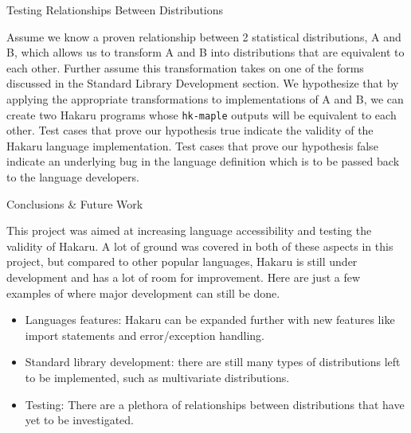 \documentclass[22pt]{beamer}
\begin{document}
\begin{frame}[fragile]
\begin{textblock}{5}
\begin{block}{\Large{Testing Relationships Between Distributions}}
\bigskip

\scriptsize{Assume we know a proven relationship between 2 statistical distributions, A and B, which allows us to transform A and B into distributions that are equivalent to each other. Further assume this transformation takes on one of the forms discussed in the Standard Library Development section. We hypothesize that by applying the appropriate transformations to implementations of A and B, we can create two Hakaru programs whose {\tt \scriptsize{hk-maple}} outputs will be equivalent to each other. Test cases that prove our hypothesis true indicate the validity of the Hakaru language implementation. Test cases that prove our hypothesis false indicate an underlying bug in the language definition which is to be passed back to the language developers.
}

\end{block}


\begin{block}{\Large{Conclusions \& Future Work}}

\scriptsize{This project was aimed at increasing language accessibility and testing the validity of Hakaru. A lot of ground was covered in both of these aspects in this project, but compared to other popular languages, Hakaru is still under development and has a lot of room for improvement. Here are just a few examples of where major development can still be done.

\begin{itemize}
    \item Languages features: Hakaru can be expanded further with new features like import statements and error/exception handling. 
    \item Standard library development: there are still many types of  distributions left to be implemented, such as multivariate distributions.
    \item Testing: There are a plethora of relationships between distributions that have yet to be investigated.  
\end{itemize}

}

\end{block}



\end{textblock}
\end{frame}
\end{document}
